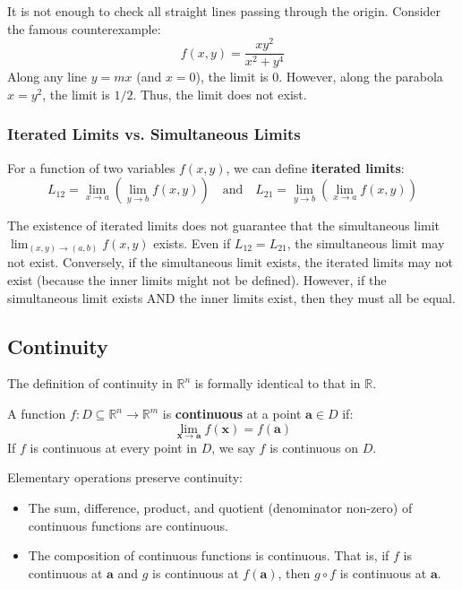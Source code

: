 \begin{remark}
It is not enough to check all straight lines passing through the origin. Consider the famous counterexample:
\[ f(x, y) = \frac{x y^2}{x^2 + y^4} \]
Along any line $y = mx$ (and $x=0$), the limit is $0$. However, along the parabola $x = y^2$, the limit is $1/2$. Thus, the limit does not exist.
\end{remark}

\subsubsection{Iterated Limits vs. Simultaneous Limits}

For a function of two variables $f(x,y)$, we can define \textbf{iterated limits}:
\[ L_{12} = \lim_{x \to a} \left( \lim_{y \to b} f(x, y) \right) \quad \text{and} \quad L_{21} = \lim_{y \to b} \left( \lim_{x \to a} f(x, y) \right) \]

\begin{proposition}
The existence of iterated limits does not guarantee that the simultaneous limit $\lim_{(x,y) \to (a,b)} f(x,y)$ exists.
Even if $L_{12} = L_{21}$, the simultaneous limit may not exist.
Conversely, if the simultaneous limit exists, the iterated limits may not exist (because the inner limits might not be defined).
However, if the simultaneous limit exists AND the inner limits exist, then they must all be equal.
\end{proposition}

\subsection{Continuity}

The definition of continuity in $\mathbb{R}^n$ is formally identical to that in $\mathbb{R}$.

\begin{definition}[Continuity]
A function $f: D \subseteq \mathbb{R}^n \to \mathbb{R}^m$ is \textbf{continuous} at a point $\mathbf{a} \in D$ if:
\[ \lim_{\mathbf{x} \to \mathbf{a}} f(\mathbf{x}) = f(\mathbf{a}) \]
If $f$ is continuous at every point in $D$, we say $f$ is continuous on $D$.
\end{definition}

Elementary operations preserve continuity:
\begin{itemize}
    \item The sum, difference, product, and quotient (denominator non-zero) of continuous functions are continuous.
    \item The composition of continuous functions is continuous. That is, if $f$ is continuous at $\mathbf{a}$ and $g$ is continuous at $f(\mathbf{a})$, then $g \circ f$ is continuous at $\mathbf{a}$.
\end{itemize}

